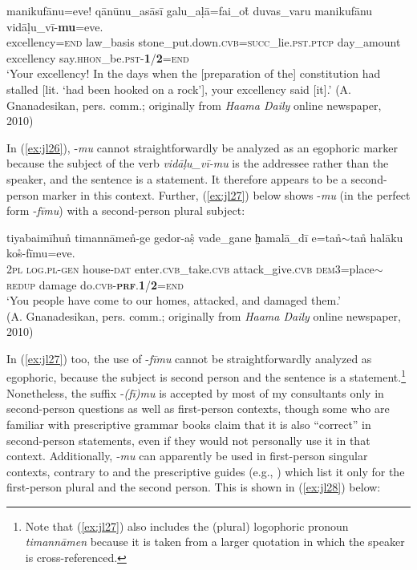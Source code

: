 \documentclass[output=paper]{langsci/langscibook}
\begin{document}
\begin{exe}
	\ex 	\label{ex:jl26}
	\gll manikufānu=eve! qānūnu\_asāsī galu\_aḷā=fai\_ot̊ duvas\_varu manikufānu vidāḷu\_vī-\textbf{mu}=eve.\\
	excellency=\textsc{end} law\_basis stone\_put.down.\textsc{cvb}=\textsc{succ}\_lie.\textsc{pst}.\textsc{ptcp} day\_amount excellency say.\textsc{hhon}\_be.\textsc{pst}-\textbf{1}/\textbf{2}=\textsc{end}\\
	\trans ‘Your excellency! In the days when the [preparation of the] constitution had stalled [lit. ‘had been hooked on a rock’], your excellency said [it].’ (A. Gnanadesikan, pers. comm.; originally from \emph{Haama Daily} online newspaper, 2010)
\end{exe}

In (\ref{ex:jl26}), -\textit{mu} cannot straightforwardly be analyzed as an egophoric marker because the subject of the verb \textit{vidāḷu\_vī-mu} is the addressee rather than the speaker, and the sentence is a statement. It therefore appears to be a second-person marker in this context. Further, (\ref{ex:jl27}) below shows -\textit{mu} (in the perfect form ‑\textit{fīmu}) with a second-person plural subject: 

\begin{exe}
	\ex 	\label{ex:jl27}
	\gll tiyabaimīhun̊ timannāmen̊-ge gedor-aṣ̊ vade\_gane h̤amalā\_dī e=tan̊$\sim$tan̊ halāku kos̊-fīmu=eve.\\
	2\textsc{pl} \textsc{log}.\textsc{pl}-\textsc{gen} house-\textsc{dat} enter.\textsc{cvb}\_take.\textsc{cvb} attack\_give.\textsc{cvb} \textsc{dem}3=place$\sim$\textsc{redup} damage do.\textsc{cvb}-\textbf{\textsc{prf}}.\textbf{1}/\textbf{2}=\textsc{end}\\
	\trans ‘You people have come to our homes, attacked, and damaged them.’ \\(A. Gnanadesikan, pers. comm.; originally from \emph{Haama Daily} online newspaper, 2010)
\end{exe}

In (\ref{ex:jl27}) too, the use of -\textit{fīmu} cannot be straightforwardly analyzed as egophoric, because the subject is second person and the sentence is a statement.\footnote{Note that (\ref{ex:jl27}) also includes the (plural) logophoric pronoun \textit{timannāmen} because it is taken from a larger quotation in which the speaker is cross-referenced.} 
Nonetheless, the suffix ‑\textit{(fī)mu} is accepted by most of my consultants only in second-person questions as well as first-person contexts, though some who are familiar with prescriptive grammar books claim that it is also “correct” in second-person statements, even if they would not personally use it in that context. Additionally, ‑\textit{mu} can apparently be used in first-person singular contexts, contrary to \cite{Fritz2002} and the prescriptive guides (e.g., \citealt{Ahmad1970}) which list it only for the first-person plural and the second person. This is shown in (\ref{ex:jl28}) below:
\end{document}
